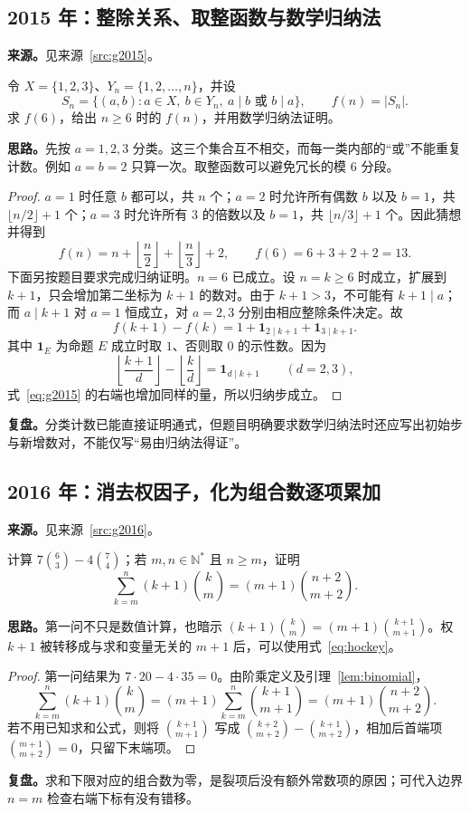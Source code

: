 \documentclass[UTF8]{ctexart}
\begin{document}
\subsection{2015 年：整除关系、取整函数与数学归纳法}\label{sec:g2015}
\textbf{来源。}见来源~\ref{src:g2015}。
\begin{example}[题意重述]
令 $X=\{1,2,3\}$、$Y_n=\{1,2,\ldots,n\}$，并设
\[
S_n=\{(a,b):a\in X,\ b\in Y_n,\ a\mid b\text{ 或 }b\mid a\},\qquad f(n)=|S_n|.
\]
求 $f(6)$，给出 $n\geq6$ 时的 $f(n)$，并用数学归纳法证明。
\end{example}
\textbf{思路。}先按 $a=1,2,3$ 分类。这三个集合互不相交，而每一类内部的“或”不能重复计数。例如 $a=b=2$ 只算一次。取整函数可以避免冗长的模 $6$ 分段。
\begin{proof}
$a=1$ 时任意 $b$ 都可以，共 $n$ 个；$a=2$ 时允许所有偶数 $b$ 以及 $b=1$，共 $\lfloor n/2\rfloor+1$ 个；$a=3$ 时允许所有 $3$ 的倍数以及 $b=1$，共 $\lfloor n/3\rfloor+1$ 个。因此猜想并得到
\begin{equation}\label{eq:g2015}
f(n)=n+\left\lfloor\frac n2\right\rfloor+\left\lfloor\frac n3\right\rfloor+2,
\qquad f(6)=6+3+2+2=13.
\end{equation}
下面另按题目要求完成归纳证明。$n=6$ 已成立。设 $n=k\geq6$ 时成立，扩展到 $k+1$，只会增加第二坐标为 $k+1$ 的数对。由于 $k+1>3$，不可能有 $k+1\mid a$；而 $a\mid k+1$ 对 $a=1$ 恒成立，对 $a=2,3$ 分别由相应整除条件决定。故
\[
f(k+1)-f(k)=1+\boldsymbol1_{2\mid k+1}+\boldsymbol1_{3\mid k+1}.
\]
其中 $\boldsymbol1_E$ 为命题 $E$ 成立时取 $1$、否则取 $0$ 的示性数。因为
\[
\left\lfloor\frac{k+1}{d}\right\rfloor-\left\lfloor\frac{k}{d}\right\rfloor
=\boldsymbol1_{d\mid k+1}\qquad(d=2,3),
\]
式~\eqref{eq:g2015} 的右端也增加同样的量，所以归纳步成立。
\end{proof}
\textbf{复盘。}分类计数已能直接证明通式，但题目明确要求数学归纳法时还应写出初始步与新增数对，不能仅写“易由归纳法得证”。

\subsection{2016 年：消去权因子，化为组合数逐项累加}\label{sec:g2016}
\textbf{来源。}见来源~\ref{src:g2016}。
\begin{example}[题意重述]
计算 $7\binom63-4\binom74$；若 $m,n\in\mathbb N^*$ 且 $n\geq m$，证明
\[
\sum_{k=m}^{n}(k+1)\binom km=(m+1)\binom{n+2}{m+2}.
\]
\end{example}
\textbf{思路。}第一问不只是数值计算，也暗示 $(k+1)\binom km=(m+1)\binom{k+1}{m+1}$。权 $k+1$ 被转移成与求和变量无关的 $m+1$ 后，可以使用式~\eqref{eq:hockey}。
\begin{proof}
第一问结果为 $7\cdot20-4\cdot35=0$。由阶乘定义及引理~\ref{lem:binomial}，
\[
\sum_{k=m}^{n}(k+1)\binom km
=(m+1)\sum_{k=m}^{n}\binom{k+1}{m+1}
=(m+1)\binom{n+2}{m+2}.
\]
若不用已知求和公式，则将 $\binom{k+1}{m+1}$ 写成 $\binom{k+2}{m+2}-\binom{k+1}{m+2}$，相加后首端项 $\binom{m+1}{m+2}=0$，只留下末端项。
\end{proof}
\textbf{复盘。}求和下限对应的组合数为零，是裂项后没有额外常数项的原因；可代入边界 $n=m$ 检查右端下标有没有错移。
\end{document}
